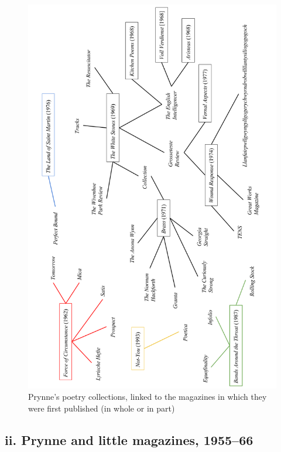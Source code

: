 \documentclass[]{article}
\begin{document}
\begin{figure}[t]
\centering
\includegraphics{figs/mags.png}
\caption{Prynne's poetry collections, linked to the magazines in which
they were first published (in whole or in part)\label{fig:mags}}
\end{figure}

\newpage

\subsection{ii. Prynne and little magazines,
1955--66}\label{ii.-prynne-and-little-magazines-195566}
\end{document}
